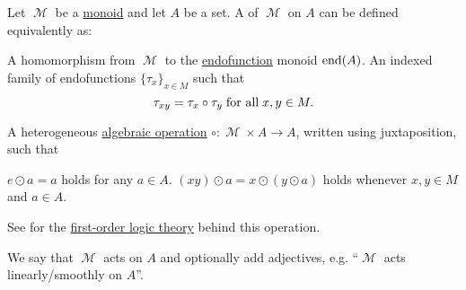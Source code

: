 \begin{definition}\label{def:left_monoid_action}
  Let \( \mscrM \) be a \hyperref[def:unital_magma/associative]{monoid} and let \( A \) be a set. A  of \( \mscrM \) on \( A \) can be defined equivalently as:
  \begin{thmenum}
     A homomorphism from \( \mscrM \) to the \hyperref[def:multi_valued_function/endofunction]{endofunction} monoid \( \operatorname{end}(A) \).
     An indexed family of endofunctions \( \{ \tau_x \}_{x \in M} \) such that
    \begin{equation}\label{eq:def:left_monoid_action/indirect_homomorphism}
      \tau_{xy} = \tau_x \circ \tau_y \T{for all} x, y \in M.
    \end{equation}

     A heterogeneous \hyperref[def:magma]{algebraic operation} \( \circ: \mscrM \times A \to A \), written using juxtaposition, such that
    \begin{thmenum}
       \( e \odot a = a \) holds for any \( a \in A \).
       \( (xy) \odot a = x \odot (y \odot a) \) holds whenever \( x, y \in M \) and \( a \in A \).
    \end{thmenum}

    See  for the \hyperref[def:first_order_theory]{first-order logic theory} behind this operation.
  \end{thmenum}

  We say that \( \mscrM \) acts on \( A \) and optionally add adjectives, e.g. \enquote{\( \mscrM \) acts linearly/smoothly on \( A \)}.
\end{definition}

